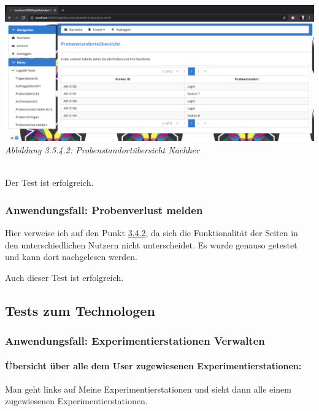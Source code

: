 \documentclass[enabledeprecatedfontcommands,fontsize=12pt,paper=a4,twoside]{scrartcl}
\begin{document}
 \hypertarget{sc3.5.4.2}{
\includegraphics[width=1\textwidth]{Screenshots/3542.png}
\textit{Abbildung 3.5.4.2: Probenstandortübersicht Nachher}
} \\

Der Test ist erfolgreich.



\subsubsection{Anwendungsfall: Probenverlust melden}

Hier verweise ich auf den Punkt \hyperlink{3.4.2}{3.4.2}, da sich die Funktionalität der Seiten in den unterschiedlichen Nutzern nicht unterscheidet. Es wurde genauso getestet und kann dort nachgelesen werden.

Auch dieser Test ist erfolgreich.


\subsection{Tests zum Technologen}

\subsubsection{Anwendungsfall: Experimentierstationen Verwalten}

\paragraph{Übersicht über alle dem User zugewiesenen Experimentierstationen:}

Man geht links auf Meine Experimentierstationen und sieht dann alle einem zugewiesenen Experimentierstationen.
\end{document}
